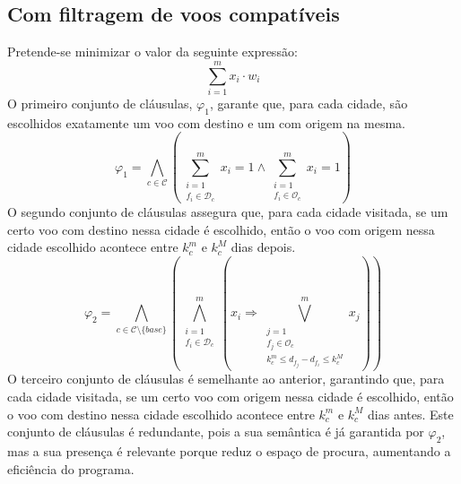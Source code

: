 \documentclass[12pt,a4paper]{article}
\begin{document}
    \subsection{Com filtragem de voos compatíveis}
        Pretende-se minimizar o valor da seguinte expressão:
        \begin{equation}
            \sum_{i = 1}^m x_i \cdot w_i
            \label{minimize_1}
        \end{equation}
        O primeiro conjunto de cláusulas, $\varphi_1$, garante que, para cada cidade, são escolhidos exatamente um voo com destino e um com origem na mesma.
        \begin{equation}
            \varphi_1 =
            \bigwedge_{c \in \mathcal{C}}
            \left(
            \sum_{\substack{i = 1 \\
                            f_i \in \mathcal{D}_c}}
                ^{m}
                {x_i} = 1
            \land
            \sum_{\substack{i = 1 \\
                            f_i \in \mathcal{O}_c}}
                ^{m}
                {x_i} = 1
            \right)
            \label{exactly_one_per_c}
        \end{equation}
        O segundo conjunto de cláusulas assegura que, para cada cidade visitada, se um certo voo com destino nessa cidade é escolhido, então o voo com origem nessa cidade escolhido acontece entre $k_c^m$ e $k_c^M$ dias depois.
        \begin{equation}
            \varphi_2 =
            \bigwedge_{c \in \mathcal{C} \setminus \{base\}}
            \left(
            \bigwedge_{\substack{i = 1 \\
                                 f_i \in \mathcal{D}_c}}
                     ^{m}
            \left(
            x_i \Rightarrow
            \bigvee_{\substack{j = 1 \\
                               f_j \in \mathcal{O}_c \\
                               k_c^m \leq d_{f_j} - d_{f_i} \leq k_c^M}}
                ^{m}
                {x_j}
            \right)
            \right)
            \label{k_nights}
        \end{equation}
        O terceiro conjunto de cláusulas é semelhante ao anterior, garantindo que, para cada cidade visitada, se um certo voo com origem nessa cidade é escolhido, então o voo com destino nessa cidade escolhido acontece entre $k_c^m$ e $k_c^M$ dias antes. Este conjunto de cláusulas é redundante, pois a sua semântica é já garantida por $\varphi_2$, mas a sua presença é relevante porque reduz o espaço de procura, aumentando a eficiência do programa.
\end{document}
